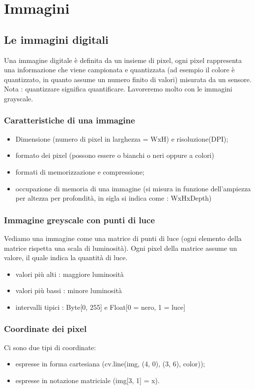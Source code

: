 \chapter{Immagini}

\section{Le immagini digitali}

 Una immagine digitale è definita da un insieme di pixel, ogni pixel rappresenta una informazione che viene campionata e quantizzata (ad esempio il colore è quantizzato, in quanto assume un numero finito di valori) misurata da un sensore. Nota : quantizzare significa quantificare. Lavoreremo molto con le immagini grayscale.
 
 \subsection{Caratteristiche di una immagine}
 \begin{itemize}
 	\item Dimensione (numero di pixel in larghezza  = WxH) e risoluzione(DPI);
 	\item formato dei pixel (possono essere o bianchi o neri oppure a colori)
 	\item formati di memorizzazione e compressione;
 	\item occupazione di memoria di una immagine (si misura in funzione dell'ampiezza per altezza per profondità, in sigla si indica come : WxHxDepth)
 \end{itemize}
 
 \subsection{Immagine greyscale con punti di luce}
 
 Vediamo una immagine come una matrice di punti di luce (ogni elemento della matrice rispetta una scala di luminosità).  Ogni pixel della matrice assume un valore, il quale indica la quantità di luce. 
 \begin{itemize}
 	\item valori più alti : maggiore luminosità
 	\item valori più bassi : minore luminosità
 	\item intervalli tipici : Byte[0, 255] e Float[0 = nero, 1 = luce]
 \end{itemize}

 \subsection{Coordinate dei pixel}
 Ci sono due tipi di coordinate:
 \begin{itemize}
 	\item espresse in forma cartesiana (cv.line(img, (4, 0), (3, 6), color));
 	\item espresse in notazione matriciale (img[3, 1] = x).
 \end{itemize}


